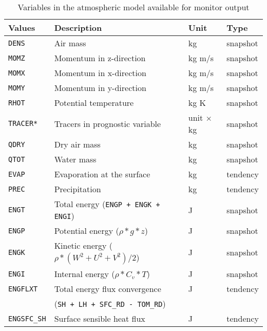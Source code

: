 \begin{table}[h]
\begin{center}
  \caption{Variables in the atmospheric model available for monitor output}
  \label{tab:varlist_monitor_atmos}
  \begin{tabularx}{150mm}{|l|X|l|l|} \hline
    \rowcolor[gray]{0.9}  Values & Description & Unit & Type \\ \hline
      \verb|DENS|         & Air mass                                  & kg     & snapshot \\
      \verb|MOMZ|         & Momentum in z-direction                   & kg m/s & snapshot \\
      \verb|MOMX|         & Momentum in x-direction                   & kg m/s & snapshot \\
      \verb|MOMY|         & Momentum in y-direction                   & kg m/s & snapshot \\
      \verb|RHOT|         & Potential temperature                     & kg K   & snapshot \\
      \verb|TRACER*|      & Tracers in prognostic variable            & unit $\times$ kg & snapshot \\
      \verb|QDRY|         & Dry air mass                              & kg & snapshot \\
      \verb|QTOT|         & Water mass                                & kg & snapshot \\
      \verb|EVAP|         & Evaporation at the surface                & kg & tendency \\
      \verb|PREC|         & Precipitation                             & kg & tendency \\
      \verb|ENGT|         & Total     energy (\verb|ENGP + ENGK + ENGI|)  & J & snapshot \\
      \verb|ENGP|         & Potential energy ($\rho * g * z$)             & J & snapshot \\
      \verb|ENGK|         & Kinetic   energy ($\rho * (W^2+U^2+V^2) / 2$) & J & snapshot \\
      \verb|ENGI|         & Internal  energy ($\rho * C_v * T$)           & J & snapshot \\
      \verb|ENGFLXT|      & Total energy flux convergence                 & J & tendency \\
                          & (\verb|SH + LH + SFC_RD - TOM_RD|) & & \\
      \verb|ENGSFC_SH|    & Surface sensible heat flux                & J & tendency \\

\end{tabularx}
\end{center}
\end{table}
